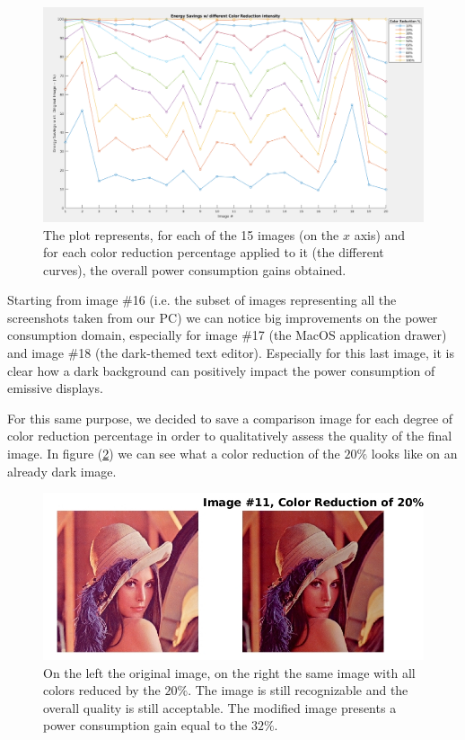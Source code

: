 \documentclass[a4paper]{article}
\begin{document}
            \begin{figure}[htp]
                \centering
                \includegraphics[width=1 \columnwidth]{./screenshots/ColorReductionOverall}
                \caption{
                        \label{fig:ColorReductionOverall}
                        The plot represents, for each of the 15 images (on the $x$ axis) and for each color reduction percentage applied to it (the different curves), the overall power consumption gains obtained.
                }
            \end{figure}

            Starting from image \#16 (i.e. the subset of images representing all the screenshots taken from our PC) we can notice big improvements on the power consumption domain, especially for image \#17 (the MacOS application drawer) and image \#18 (the dark-themed text editor). Especially for this last image, it is clear how a dark background can positively impact the power consumption of emissive displays.

            For this same purpose, we decided to save a comparison image for each degree of color reduction percentage in order to qualitatively assess the quality of the final image. In figure (\ref{fig:color_reduction_20perc_img_11}) we can see what a color reduction of the $20\%$ looks like on an already dark image.

            \begin{figure}[htp]
                \centering
                \includegraphics[width=0.6 \columnwidth]{./screenshots/color_reduction_20perc_img_11.jpg}
                \caption{
                        \label{fig:color_reduction_20perc_img_11}
                        On the left the original image, on the right the same image with all colors reduced by the $20\%$. The image is still recognizable and the overall quality is still acceptable. The modified image presents a power consumption gain equal to the $32\%$.
                }
            \end{figure}
\end{document}

